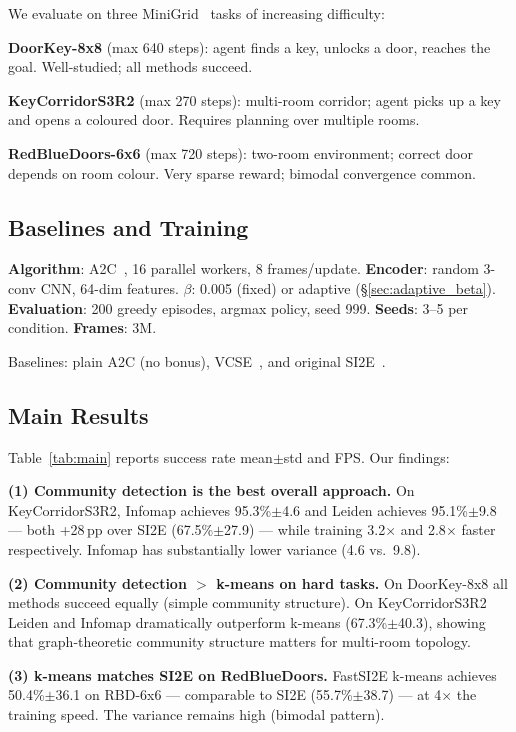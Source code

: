 \documentclass[10pt,twocolumn]{article}
\newcommand{\si}{SI2E}
\begin{document}
We evaluate on three MiniGrid~\citep{minigrid2023} tasks of increasing difficulty:

\textbf{DoorKey-8x8} (max 640 steps): agent finds a key, unlocks a door, reaches
the goal. Well-studied; all methods succeed.

\textbf{KeyCorridorS3R2} (max 270 steps): multi-room corridor; agent picks up a
key and opens a coloured door. Requires planning over multiple rooms.

\textbf{RedBlueDoors-6x6} (max 720 steps): two-room environment; correct door
depends on room colour. Very sparse reward; bimodal convergence common.

\subsection{Baselines and Training}

\textbf{Algorithm}: A2C~\citep{a2c2016}, 16 parallel workers, 8 frames/update.
\textbf{Encoder}: random 3-conv CNN, 64-dim features.
\textbf{$\beta$}: 0.005 (fixed) or adaptive (\S\ref{sec:adaptive_beta}).
\textbf{Evaluation}: 200 greedy episodes, argmax policy, seed 999.
\textbf{Seeds}: 3--5 per condition. \textbf{Frames}: 3M.

Baselines: plain A2C (no bonus), VCSE~\citep{vcse2022}, and original
\si{}~\citep{si2e2024}.

\subsection{Main Results}

Table~\ref{tab:main} reports success rate mean$\pm$std and FPS. Our findings:

\textbf{(1) Community detection is the best overall approach.} On KeyCorridorS3R2,
Infomap achieves 95.3\%$\pm$4.6 and Leiden achieves 95.1\%$\pm$9.8 --- both
+28\,pp over SI2E (67.5\%$\pm$27.9) --- while training 3.2$\times$ and 2.8$\times$
faster respectively. Infomap has substantially lower variance (4.6 vs.\ 9.8).

\textbf{(2) Community detection $>$ k-means on hard tasks.} On DoorKey-8x8
all methods succeed equally (simple community structure). On KeyCorridorS3R2
Leiden and Infomap dramatically outperform k-means (67.3\%$\pm$40.3), showing
that graph-theoretic community structure matters for multi-room topology.

\textbf{(3) k-means matches SI2E on RedBlueDoors.} FastSI2E k-means achieves
50.4\%$\pm$36.1 on RBD-6x6 --- comparable to SI2E (55.7\%$\pm$38.7) --- at
4$\times$ the training speed. The variance remains high (bimodal pattern).
\end{document}
